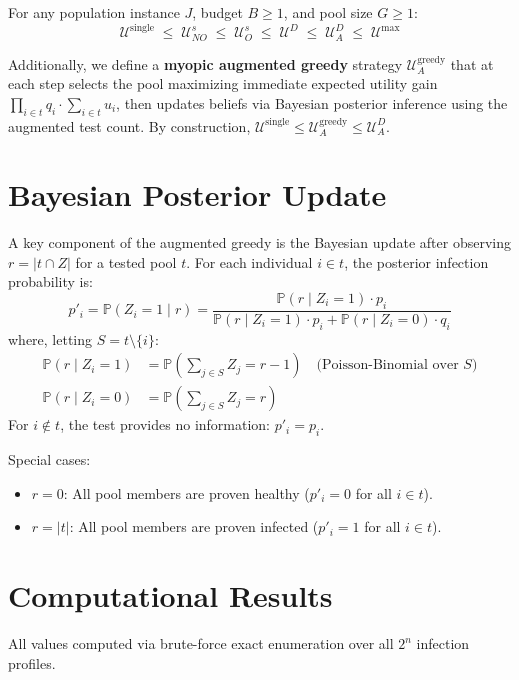 \documentclass[11pt]{article}
\newcommand{\Usingle}{\mathcal{U}^{\text{single}}}
\newcommand{\UsNO}{\mathcal{U}^{s}_{NO}}
\newcommand{\UsO}{\mathcal{U}^{s}_{O}}
\newcommand{\UD}{\mathcal{U}^{D}}
\newcommand{\UDA}{\mathcal{U}^{D}_{A}}
\newcommand{\Umax}{\mathcal{U}^{\max}}
\newcommand{\Ugreedy}{\mathcal{U}^{\text{greedy}}_{A}}
\begin{document}
\begin{theorem}
For any population instance $J$, budget $B \geq 1$, and pool size $G \geq 1$:
\[
    \Usingle \;\leq\; \UsNO \;\leq\; \UsO \;\leq\; \UD \;\leq\; \UDA \;\leq\; \Umax
\]
\end{theorem}

Additionally, we define a \textbf{myopic augmented greedy} strategy $\Ugreedy$
that at each step selects the pool maximizing immediate expected utility gain
$\prod_{i \in t} q_i \cdot \sum_{i \in t} u_i$, then updates beliefs via
Bayesian posterior inference using the augmented test count. By construction,
$\Usingle \leq \Ugreedy \leq \UDA$.


\section{Bayesian Posterior Update}

A key component of the augmented greedy is the Bayesian update after observing
$r = |t \cap Z|$ for a tested pool $t$. For each individual $i \in t$, the
posterior infection probability is:
\[
    p'_i = \mathbb{P}(Z_i = 1 \mid r) = \frac{\mathbb{P}(r \mid Z_i = 1) \cdot p_i}
    {\mathbb{P}(r \mid Z_i = 1) \cdot p_i + \mathbb{P}(r \mid Z_i = 0) \cdot q_i}
\]
where, letting $S = t \setminus \{i\}$:
\begin{align*}
    \mathbb{P}(r \mid Z_i = 1) &= \mathbb{P}\!\left(\sum_{j \in S} Z_j = r - 1\right)
    \quad \text{(Poisson-Binomial over $S$)} \\
    \mathbb{P}(r \mid Z_i = 0) &= \mathbb{P}\!\left(\sum_{j \in S} Z_j = r\right)
\end{align*}
For $i \notin t$, the test provides no information: $p'_i = p_i$.

\noindent Special cases:
\begin{itemize}
    \item $r = 0$: All pool members are proven healthy ($p'_i = 0$ for all $i \in t$).
    \item $r = |t|$: All pool members are proven infected ($p'_i = 1$ for all $i \in t$).
\end{itemize}


\section{Computational Results}

All values computed via brute-force exact enumeration over all $2^n$ infection profiles.
\end{document}
